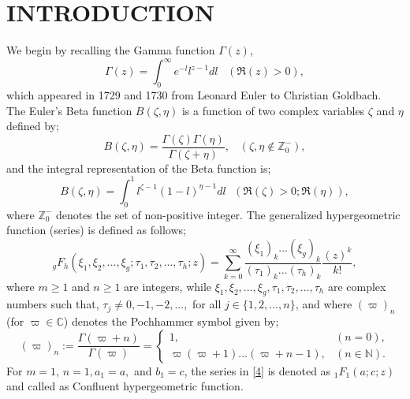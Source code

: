 \documentclass{amsart}
\theoremstyle{definition}
\theoremstyle{remark}
\numberwithin{equation}{section}
\begin{document}
\section{INTRODUCTION}
We begin by recalling the Gamma function $\Gamma(z)$,
  \begin{equation}\label{1}
    \Gamma (z) = \int_{0}^{\infty} e^{-l} l^{z-1} dl \,\,\,\,\, (\Re(z)>0),
  \end{equation}which appeared in 1729 and 1730 from Leonard Euler to Christian Goldbach.
  The Euler's Beta function $B(\zeta, \eta)$ is a function of two complex variables $\zeta$ and $\eta$ defined by\cite{Rain};
 \begin{equation}\label{2}
     B(\zeta, \eta) = \frac{\Gamma (\zeta) \Gamma(\eta)}{\Gamma (\zeta + \eta)}, \, \, \, \, \, (\zeta, \eta \notin \mathbb {Z}^{-} _{0}),
 \end{equation} and the integral representation of the Beta function is;
 \begin{equation}\label{3}
   B(\zeta, \eta) = \int_{0}^{1} l^{\zeta-1} (1-l)^{\eta-1} dl \, \, \, \, (\Re(\zeta)>0; \Re (\eta)),
 \end{equation}where $\mathbb {Z}_{0} ^{-}$ denotes the set of non-positive integer.
  The generalized hypergeometric function (series) is defined as follows\cite{Whit, Erd};
\begin{equation}\label{4}
  _{g}F_{h} (\xi_{1}, \xi_{2},..., \xi_{g};\tau_{1}, \tau_{2},..., \tau_{h}; z) = \sum_{k=0}^{\infty} \frac{(\xi_{1})_{k}... (\xi_{g})_{k}}{(\tau_{1})_{k}... (\tau_{h})_{k}} \frac{(z)^{k}}{k!},
\end{equation} where $m\geq1$ and $n\geq1$ are integers,
while $\xi_{1}, \xi_{2},..., \xi_{g}, \tau_{1}, \tau_{2},..., \tau_{h}$ are complex numbers such that, $\tau_{j} \neq 0,-1,-2,...,$ for all $j \in \{1,2,...,n\}$, and where $(\varpi)_{n}$ (for $\varpi \in \mathbb{C}$) denotes the Pochhammer symbol given by\cite{Rain};
\begin{equation}\label{5}
         (\varpi)_{n} := \frac{\Gamma (\varpi + n)}{\Gamma (\varpi)}=
                 \begin{cases}
                   1, &  (n=0), \\
                   \varpi (\varpi+1)...(\varpi+n-1), & (n \in \mathbb{N}).
                 \end{cases}
       \end{equation}
For $m=1,\, n=1, a_{1}=a,$ and $b_{1}=c$, the series in \eqref{4} is denoted as $_{1}F_{1} (a;c;z)$ and called as Confluent hypergeometric function.
\end{document}
